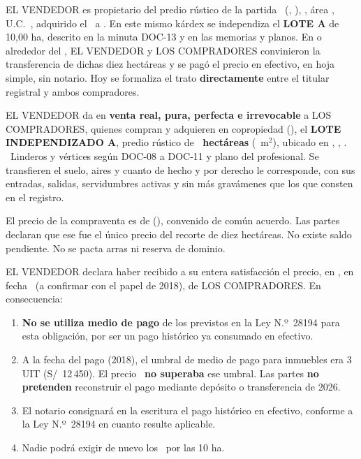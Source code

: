 \documentclass[12pt,a4paper]{article}
\begin{document}
EL VENDEDOR es propietario del predio rústico de la partida \PartidaMatriz\ (\OficinaRegistral, \ZonaRegistral), \UbicacionRegistral, área \AreaMatriz, U.C.\ \UnidadCatastral, adquirido el \FechaAdquisicionMatriz\ a \VendedoresAnteriores. En este mismo kárdex se independiza el \textbf{LOTE A} de 10,00 ha, descrito en la minuta DOC-13 y en las memorias y planos. En o alrededor del \FechaPago, EL VENDEDOR y LOS COMPRADORES convinieron la transferencia de dichas diez hectáreas y se pagó el precio en efectivo, en hoja simple, sin notario. Hoy se formaliza el trato \textbf{directamente} entre el titular registral y ambos compradores.

EL VENDEDOR da en \textbf{venta real, pura, perfecta e irrevocable} a LOS COMPRADORES, quienes compran y adquieren en copropiedad (\PorcentajeCopropiedad), el \textbf{LOTE INDEPENDIZADO A}, predio rústico de \textbf{\AreaIndependizarHa\ hectáreas} (\AreaIndependizarMetros\ m$^2$), ubicado en \Distrito, \Provincia, \Departamento. \CriterioRecorte\ Linderos y vértices según DOC-08 a DOC-11 y plano del profesional. Se transfieren el suelo, aires y cuanto de hecho y por derecho le corresponde, con sus entradas, salidas, servidumbres activas y sin más gravámenes que los que consten en el registro.

El precio de la compraventa es de \textbf{\MontoPago} (\textbf{\MontoPagoLetras}), convenido de común acuerdo. Las partes declaran que ese fue el único precio del recorte de diez hectáreas. No existe saldo pendiente. No se pacta arras ni reserva de dominio.

EL VENDEDOR declara haber recibido a su entera satisfacción el precio, en \textbf{\FormaPagoHistorica}, en fecha \FechaPago\ (a confirmar con el papel de 2018), de LOS COMPRADORES. En consecuencia:

\begin{enumerate}[leftmargin=1.15cm]
\item \textbf{No se utiliza medio de pago} de los previstos en la Ley N.º\ 28194 para esta obligación, por ser un pago histórico ya consumado en efectivo.
\item A la fecha del pago (2018), el umbral de medio de pago para inmuebles era 3 UIT (S/\ 12\,450). El precio \MontoPago\ \textbf{no superaba} ese umbral. Las partes \textbf{no pretenden} reconstruir el pago mediante depósito o transferencia de 2026.
\item El notario consignará en la escritura el pago histórico en efectivo, conforme a la Ley N.º\ 28194 en cuanto resulte aplicable.
\item Nadie podrá exigir de nuevo los \MontoPago\ por las 10 ha.
\end{enumerate}
\end{document}
